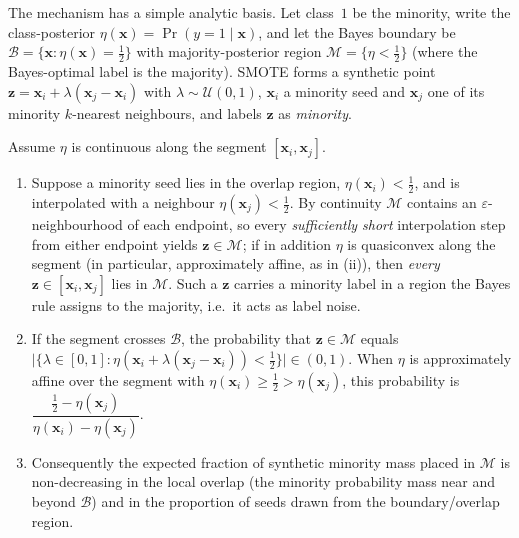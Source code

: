 The mechanism has a simple analytic basis. Let class~$1$ be the minority, write the
class-posterior $\eta(\mathbf{x})=\Pr(y{=}1\mid\mathbf{x})$, and let the Bayes
boundary be $\mathcal{B}=\{\mathbf{x}:\eta(\mathbf{x})=\tfrac12\}$ with
majority-posterior region $\mathcal{M}=\{\eta<\tfrac12\}$ (where the Bayes-optimal
label is the majority). SMOTE forms a synthetic point
$\mathbf{z}=\mathbf{x}_i+\lambda(\mathbf{x}_j-\mathbf{x}_i)$ with
$\lambda\sim\mathcal{U}(0,1)$, $\mathbf{x}_i$ a minority seed and $\mathbf{x}_j$
one of its minority $k$-nearest neighbours, and labels $\mathbf{z}$ as
\emph{minority}.

\begin{proposition}\label{prop:cross}
Assume $\eta$ is continuous along the segment $[\mathbf{x}_i,\mathbf{x}_j]$.
\begin{enumerate}
\item[(i)] Suppose a minority seed lies in the overlap region,
  $\eta(\mathbf{x}_i)<\tfrac12$, and is interpolated with a neighbour
  $\eta(\mathbf{x}_j)<\tfrac12$. By continuity $\mathcal{M}$ contains an
  $\varepsilon$-neighbourhood of each endpoint, so every \emph{sufficiently short}
  interpolation step from either endpoint yields $\mathbf{z}\in\mathcal{M}$; if in
  addition $\eta$ is quasiconvex along the segment (in particular, approximately
  affine, as in (ii)), then \emph{every} $\mathbf{z}\in[\mathbf{x}_i,\mathbf{x}_j]$
  lies in $\mathcal{M}$. Such a $\mathbf{z}$ carries a minority label in a region
  the Bayes rule assigns to the majority, i.e.\ it acts as label noise.
\item[(ii)] If the segment crosses $\mathcal{B}$, the probability that
  $\mathbf{z}\in\mathcal{M}$ equals
  $\big|\{\lambda\in[0,1]:\eta(\mathbf{x}_i+\lambda(\mathbf{x}_j-\mathbf{x}_i))<\tfrac12\}\big|\in(0,1)$.
  When $\eta$ is approximately affine over the segment with
  $\eta(\mathbf{x}_i)\ge\tfrac12>\eta(\mathbf{x}_j)$, this probability is
  $\dfrac{\tfrac12-\eta(\mathbf{x}_j)}{\eta(\mathbf{x}_i)-\eta(\mathbf{x}_j)}$.
\item[(iii)] Consequently the expected fraction of synthetic minority mass placed
  in $\mathcal{M}$ is non-decreasing in the local overlap (the minority probability
  mass near and beyond $\mathcal{B}$) and in the proportion of seeds drawn from the
  boundary/overlap region.
\end{enumerate}
\end{proposition}

